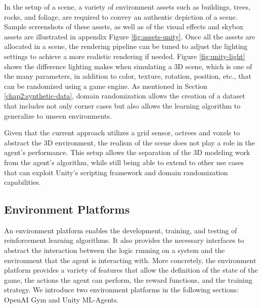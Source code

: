 In the setup of a scene, a variety of environment assets such as buildings, trees, rocks, and foliage, are required to convey an authentic depiction of a scene. Sample screenshots of these assets, as well as of the visual effects and skybox assets are illustrated in appendix Figure \ref{fig:assets-unity}. Once all the assets are allocated in a scene, the rendering pipeline can be tuned to adjust the lighting settings to achieve a more realistic rendering if needed. Figure \ref{fig:unity-light} shows the difference lighting makes when simulating a 3D scene, which is one of the many parameters, in addition to color, texture, rotation, position, etc., that can be randomized using a game engine. 
As mentioned in Section \ref{chap2:synthetic-data}, domain randomization allows the creation of a dataset that includes not only corner cases but also allows the learning algorithm to generalize to unseen environments.


Given that the current approach utilizes a grid sensor, octrees and voxels to abstract the 3D environment, the realism of the scene does not play a role in the agent's performance. This setup allows the separation of the 3D modeling work from the agent's algorithm, while still being able to extend to other use cases that can exploit Unity's scripting framework and domain randomization capabilities.



\subsection{Environment Platforms}
An environment platform enables the development, training, and testing of reinforcement learning algorithms. It also provides the necessary interfaces to abstract the interaction between the logic running on a system and the environment that the agent is interacting with.
More concretely, the environment platform provides a variety of features that allow the definition of the state of the game, the actions the agent can perform, the reward functions, and the training strategy. We introduce two environment platforms in the following sections: OpenAI Gym and Unity ML-Agents.

